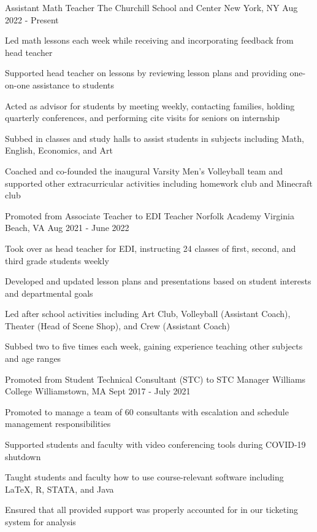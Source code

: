 \begin{cventries}
  \cventry
  {Assistant Math Teacher}
  {The Churchill School and Center}
  {New York, NY}
  {Aug 2022 - Present}
  {
    \begin{cvitems}
      \item {Led math lessons each week while receiving and incorporating feedback from head teacher}
      \item {Supported head teacher on lessons by reviewing lesson plans and providing one-on-one assistance to students}
      \item {Acted as advisor for students by meeting weekly, contacting families, holding quarterly conferences, and performing cite visits for seniors on internship}
      \item {Subbed in classes and study halls to assist students in subjects including Math, English, Economics, and Art}
      \item {Coached and co-founded the inaugural Varsity Men's Volleyball team and supported other extracurricular activities including homework club and Minecraft club}
    \end{cvitems}
  }

  \cventry
  {Promoted from Associate Teacher to EDI Teacher}
  {Norfolk Academy}
  {Virginia Beach, VA}
  {Aug 2021 - June 2022}
  {
    \begin{cvitems}
      \item {Took over as head teacher for EDI, instructing 24 classes of first, second, and third grade students weekly}
      \item {Developed and updated lesson plans and presentations based on student interests and departmental goals}
      \item {Led after school activities including Art Club, Volleyball (Assistant Coach), Theater (Head of Scene Shop), and Crew (Assistant Coach)}
      \item {Subbed two to five times each week, gaining experience teaching other subjects and age ranges}
    \end{cvitems}
  }

  \cventry
  {Promoted from Student Technical Consultant (STC) to STC Manager}
  {Williams College}
  {Williamstown, MA}
  {Sept 2017 - July 2021}
  {
    \begin{cvitems}
      \item {Promoted to manage a team of 60 consultants with escalation and schedule management responsibilities}
      \item{Supported students and faculty with video conferencing tools during COVID-19 shutdown}
      \item {Taught students and faculty how to use course-relevant software including LaTeX, R, STATA, and Java}
      \item {Ensured that all provided support was properly accounted for in our ticketing system for analysis}
    \end{cvitems}
  }


\end{cventries}
